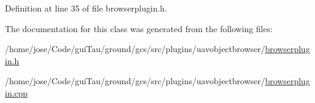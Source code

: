 Definition at line 35 of file browserplugin.\-h.



The documentation for this class was generated from the following files\-:\begin{DoxyCompactItemize}
\item 
/home/jose/\-Code/gui\-Tau/ground/gcs/src/plugins/uavobjectbrowser/\hyperlink{browserplugin_8h}{browserplugin.\-h}\item 
/home/jose/\-Code/gui\-Tau/ground/gcs/src/plugins/uavobjectbrowser/\hyperlink{browserplugin_8cpp}{browserplugin.\-cpp}\end{DoxyCompactItemize}
